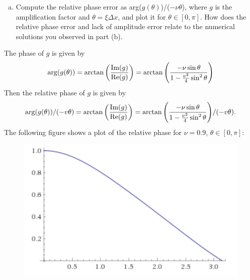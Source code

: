 \documentclass[12pt]{article}
\begin{document}
\begin{enumerate}[(a)]
\begin{figure}[H]
\end{figure} 
\newpage
\item Compute the relative phase error as arg($g(\theta)$)/($-\nu\theta$), where $g$ is the amplification factor and $\theta = \xi\Delta x$, and plot it for $\theta\in[0,\pi]$.  How does the relative phase error and lack of amplitude error relate to the numerical solutions you observed in part (b).
\end{enumerate}

The phase of $g$ is given by
$$\arg(g(\theta)) = \arctan\qty(\dfrac{\Im(g)}{\Re(g)})= \arctan\qty(\dfrac{-\nu\sin\theta}{1-\frac{\nu^2}{4}\sin^2\theta}) $$
Then the relative phase of $g$ is given by
$$\arg(g(\theta))/(-v\theta) = \arctan\qty(\dfrac{\Im(g)}{\Re(g)})= \arctan\qty(\dfrac{-\nu\sin\theta}{1-\frac{\nu^2}{4}\sin^2\theta})/(-v\theta).$$
The following figure shows a plot of the relative phase for $\nu=0.9$, $\theta \in [0,\pi]$:
\begin{figure}[H]
\centering\includegraphics{relphase.png}
\end{figure}
\end{document}
